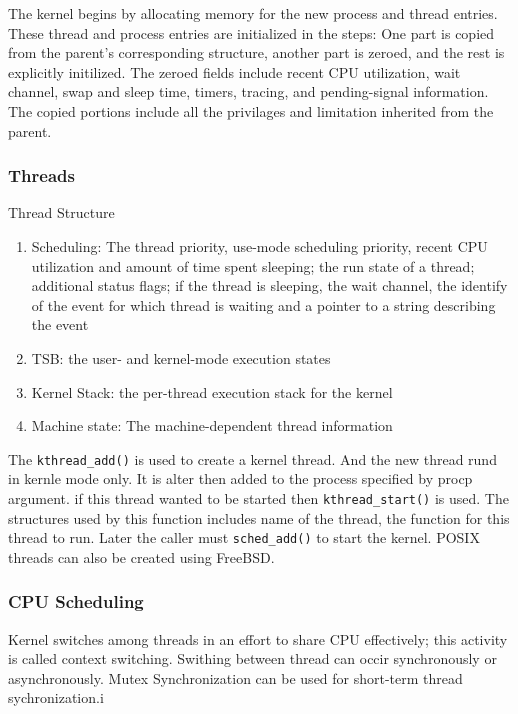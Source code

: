 \documentclass[letterpaper,10pt,draftclsnofoot,onecolumn]{IEEEtran}
\begin{document}
The kernel begins by allocating memory for the new process and thread entries. These thread and process entries are initialized in the steps: One part is copied from the parent's corresponding structure, another part is zeroed, and the rest is explicitly initilized. The zeroed fields include recent CPU utilization, wait channel, swap and sleep time, timers, tracing, and pending-signal information. The copied portions include all the privilages and limitation inherited from the parent.

\subsubsection*{Threads}

Thread Structure
\begin{enumerate}
\item Scheduling: The thread priority, use-mode scheduling priority, recent CPU utilization and amount of time spent sleeping; the run state of a thread; additional status flags; if the thread is sleeping, the wait channel, the identify of the event for which thread is waiting and a pointer to a string describing the event
\item TSB: the user- and kernel-mode execution states
\item Kernel Stack: the per-thread execution stack for the kernel
\item Machine state: The machine-dependent thread information
\end{enumerate}

The \verb|kthread_add()| is used to create a kernel thread. And the new thread rund in kernle mode only. It is alter then added to the process specified by procp argument. if this thread wanted to be started then \verb|kthread_start()| is used. The structures used by this function includes name of the thread, the function for this thread to run. Later the caller must \verb|sched_add()| to start the kernel. POSIX threads can also be created using FreeBSD.

\subsubsection*{CPU Scheduling}

Kernel switches among threads in an effort to share CPU effectively; this activity is called context switching. Swithing between thread can occir synchronously or asynchronously. Mutex Synchronization can be used for short-term thread sychronization.i
\end{document}
